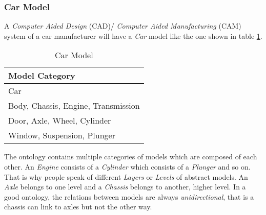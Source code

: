 %
%
%
%
%
%
%

\subsubsection{Car Model}
\label{car_model_heading}

A \emph{Computer Aided Design} (CAD)/ \emph{Computer Aided Manufacturing} (CAM)
system of a car manufacturer will have a \emph{Car} model like the one shown in
table \ref{car_table}.

\begin{table}[ht]
    \begin{center}
        \begin{footnotesize}
        \begin{tabular}{| p{105mm} |}
            \hline
            \textbf{Model Category}\\
            \hline
            Car\\
            \hline
            Body, Chassis, Engine, Transmission\\
            \hline
            Door, Axle, Wheel, Cylinder\\
            \hline
            Window, Suspension, Plunger\\
            \hline
        \end{tabular}
        \end{footnotesize}
        \caption{Car Model}
        \label{car_table}
    \end{center}
\end{table}

The ontology contains multiple categories of models which are composed of each
other. An \emph{Engine} consists of a \emph{Cylinder} which consists of a
\emph{Plunger} and so on. That is why people speak of different \emph{Layers}
or \emph{Levels} of abstract models. An \emph{Axle} belongs to one level and a
\emph{Chassis} belongs to another, higher level. In a good ontology, the
relations between models are always \emph{unidirectional}, that is a chassis
can link to axles but not the other way.
